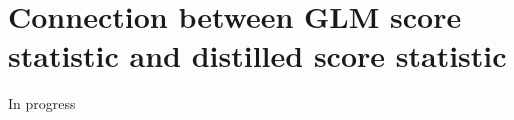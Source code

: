 \documentclass[12pt]{article}
\newcommand{\bs}[1]{\boldsymbol{#1}}
\begin{document}
\section{Connection between GLM score statistic and distilled score statistic}

In progress






\end{document}
